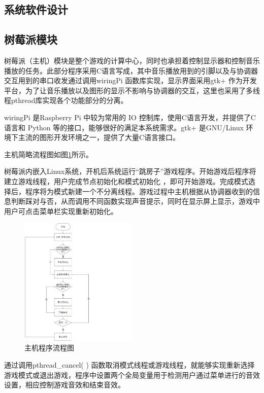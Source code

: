 \documentclass[a4paper,11pt,onecolumn,twoside]{article}
\begin{document}
\begin{spacing}{1.2}
\section{系统软件设计}

\subsection{树莓派模块}
    树莓派（主机）模块是整个游戏的计算中心，同时也承担着控制显示器和控制音乐播放的任务。此部分程序采用C语言写成，其中音乐播放用到的引脚以及与协调器交互用到的串口收发通过调用wiringPi 函数库实现，显示界面采用gtk+ 作为开发平台，为了让音乐播放以及图形的显示不影响与协调器的交互，这里也采用了多线程pthread库实现各个功能部分的分离。

    wiringPi 是Raspberry Pi 中较为常用的 IO 控制库，使用C语言开发，并提供了C语言和 Python 等的接口，能够很好的满足本系统需求。gtk+ 是GNU/Linux 环境下主流的图形开发环境之一，提供了大量C语言接口。

    主机简略流程图如图\ref{fig:liucheng}所示。

    树莓派内嵌入Linux系统，开机后系统运行“跳房子”游戏程序。开始游戏后程序将建立游戏线程，用户完成节点初始化和模式初始化 ，即可开始游戏。完成模式选择后，程序将为模式新建一个不分离线程。游戏过程中主机根据从协调器收到的信息判断踩对与否，从而调用不同函数实现声音提示，同时在显示屏上显示，游戏中用户可点击菜单栏实现重新初始化。
 
\begin{figure}[htb]
    \centering
    {\includegraphics [width=0.5\textwidth]{./image/流程图.png}
    \caption{主机程序流程图}
    \label{fig:liucheng}}
\end{figure}

    通过调用pthread\_cancel( ) 函数取消模式线程或游戏线程，就能够实现重新选择游戏模式或退出游戏，程序中设置两个全局变量用于检测用户通过菜单进行的音效设置，相应控制游戏音效和结束音效。


\end{spacing}
\end{document}
